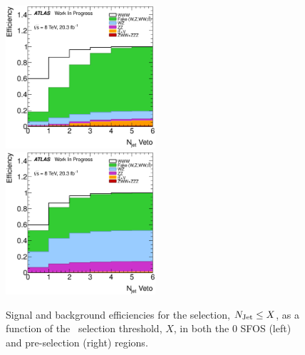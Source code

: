 \begin{figure}[ht!]
\centering
\includegraphics[width=0.495\textwidth]{figures/optimization/SignalRegionsPreselection_0SFOS_Efficiencies/NJets_LeftCumulative.eps}
\includegraphics[width=0.495\textwidth]{figures/optimization/SignalRegions_0p5mmZ0_Preselection_Efficiencies/NJets_LeftCumulative.eps}
\caption{ Signal and background efficiencies for the selection,
$N_{\textrm{Jet}} \leq X$, as a function of the \njet~selection
threshold, $X$, in both the 0 SFOS (left) and pre-selection (right) regions.  }
\label{fig:njet_eff}
\end{figure}


